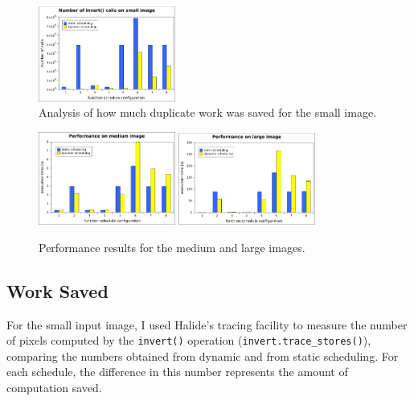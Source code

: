 \documentclass{article}
\begin{document}
\begin{figure}[h]
	\begin{center}
	\includegraphics[width=0.4\textwidth]{graphs/small.pdf}
	\end{center}
	\caption{Analysis of how much duplicate work was saved for the small image.}
	\label{fig:graph-trace}
\end{figure}
\begin{figure}[h]
	\begin{center}
	\includegraphics[width=0.4\textwidth]{graphs/medium.pdf} \quad
	\includegraphics[width=0.4\textwidth]{graphs/large.pdf}
	\end{center}
	\caption{Performance results for the medium and large images.}
	\label{fig:graph-perf}
\end{figure}

\subsection{Work Saved}

For the small input image, I used Halide's tracing facility to measure the number of pixels computed by the \texttt{invert()} operation (\texttt{invert.trace\_stores()}), comparing the numbers obtained from dynamic and from static scheduling. For each schedule, the difference in this number represents the amount of computation saved.
\end{document}
